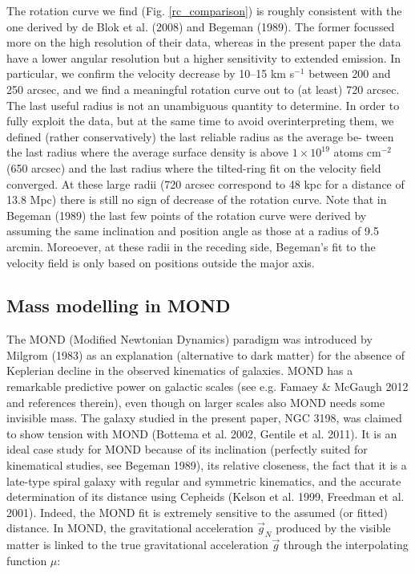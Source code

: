 \documentclass[traditabstract]{aa}
\begin{document}
The rotation curve we find (Fig. \ref{rc_comparison}) is roughly consistent
with the one derived by de Blok et al. (2008) and Begeman (1989). 
The former focussed more on the high resolution of their data,
whereas in the present paper the data have a lower angular resolution
but a higher sensitivity to extended emission. In particular, we
confirm the velocity decrease by 10--15 km s$^{-1}$ between 200 and
250 
arcsec, and we find a meaningful rotation curve out to (at least) 720
arcsec. The last useful radius is not an unambiguous quantity to
determine. In order to fully exploit the data, but at the same time to
avoid overinterpreting them, we defined (rather conservatively) the
last reliable radius as the average be- tween the last radius where
the average surface density is above $1 \times 10^{19}$ atoms cm$^{-2}$ (650 arcsec)
and the last radius where the tilted-ring fit on the velocity field
converged. At these large radii (720 arcsec correspond to 48 kpc for a
distance of 13.8 Mpc) there is still no sign of decrease of the
rotation curve. Note that in Begeman (1989) the last few points of the
rotation curve were derived by assuming the same inclination and
position angle as those at a radius of 9.5 arcmin. Moreoever, at these
radii in the receding side, Begeman's fit to the velocity field is
only based on positions outside the major axis. 


\subsection{Mass modelling in MOND}

The MOND (Modified Newtonian Dynamics) paradigm was introduced by
Milgrom (1983) as an explanation (alternative to dark matter) for the
absence of Keplerian decline in the observed kinematics of
galaxies. MOND has a remarkable predictive power on galactic scales
(see e.g. Famaey \& McGaugh 2012 and references therein), even though
on larger scales also MOND needs some invisible mass. The galaxy
studied in the present paper, NGC 3198, was claimed to show tension
with MOND (Bottema et al. 2002, Gentile et al. 2011). It is an ideal
case study for MOND because of its inclination (perfectly suited for
kinematical studies, see Begeman 1989), its relative closeness, the
fact that it is a late-type spiral galaxy with regular and symmetric
kinematics, and the accurate determination of its distance using
Cepheids (Kelson et al. 1999, Freedman et al. 2001). Indeed, the MOND
fit is extremely sensitive to the assumed (or fitted) distance. In
MOND, the gravitational acceleration $\vec{g}_{N}$ produced by the visible
matter is linked to the true gravitational acceleration $\vec{g}$ through
the interpolating function $\mu$:  
\end{document}
